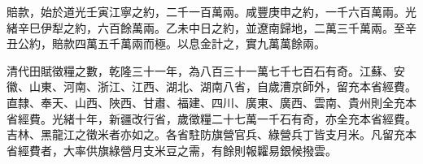 \begin{pinyinscope}
賠款，始於道光壬寅江寧之約，二千一百萬兩。咸豐庚申之約，一千六百萬兩。光緒辛巳伊犁之約，六百餘萬兩。乙未中日之約，並遼南歸地，二萬三千萬兩。至辛丑公約，賠款四萬五千萬兩而極。以息金計之，實九萬萬餘兩。

清代田賦徵糧之數，乾隆三十一年，為八百三十一萬七千七百石有奇。江蘇、安徽、山東、河南、浙江、江西、湖北、湖南八省，自歲漕京師外，留充本省經費。直隸、奉天、山西、陜西、甘肅、福建、四川、廣東、廣西、雲南、貴州則全充本省經費。光緒十年，新疆改行省，歲徵糧二十七萬一千石有奇，亦全充本省經費。吉林、黑龍江之徵米者亦如之。各省駐防旗營官兵、綠營兵丁皆支月米。凡留充本省經費者，大率供旗綠營月支米豆之需，有餘則報糶易銀候撥雲。


\end{pinyinscope}